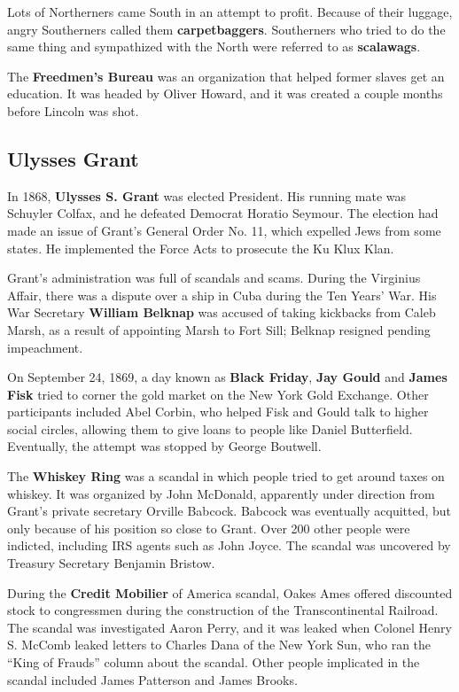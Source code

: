 Lots of Northerners came South in an attempt to profit.
Because of their luggage, angry Southerners called them \textbf{carpetbaggers}.
Southerners who tried to do the same thing and sympathized with the North were referred to as \textbf{scalawags}.

The \textbf{Freedmen's Bureau} was an organization that helped former slaves get an education.
It was headed by Oliver Howard, and it was created a couple months before Lincoln was shot.

\subsection*{Ulysses Grant}

In 1868, \textbf{Ulysses S. Grant} was elected President.
His running mate was Schuyler Colfax, and he defeated Democrat Horatio Seymour.
The election had made an issue of Grant's General Order No. 11, which expelled Jews from some states.
He implemented the Force Acts to prosecute the Ku Klux Klan.

Grant's administration was full of scandals and scams.
During the Virginius Affair, there was a dispute over a ship in Cuba during the Ten Years' War.
His War Secretary \textbf{William Belknap} was accused of taking kickbacks from Caleb Marsh,
as a result of appointing Marsh to Fort Sill;
Belknap resigned pending impeachment.

On September 24, 1869, a day known as \textbf{Black Friday},
\textbf{Jay Gould} and \textbf{James Fisk} tried to corner the gold market on the New York Gold Exchange.
Other participants included Abel Corbin, who helped Fisk and Gould talk to higher social circles,
allowing them to give loans to people like Daniel Butterfield.
Eventually, the attempt was stopped by George Boutwell.

The \textbf{Whiskey Ring} was a scandal in which people tried to get around taxes on whiskey.
It was organized by John McDonald, apparently under direction from Grant's private secretary Orville Babcock.
Babcock was eventually acquitted, but only because of his position so close to Grant.
Over 200 other people were indicted, including IRS agents such as John Joyce.
The scandal was uncovered by Treasury Secretary Benjamin Bristow.

During the \textbf{Credit Mobilier} of America scandal,
Oakes Ames offered discounted stock to congressmen during the construction of the Transcontinental Railroad.
The scandal was investigated Aaron Perry,
and it was leaked when Colonel Henry S. McComb leaked letters to Charles Dana of the New York Sun,
who ran the ``King of Frauds'' column about the scandal.
Other people implicated in the scandal included James Patterson and James Brooks.


